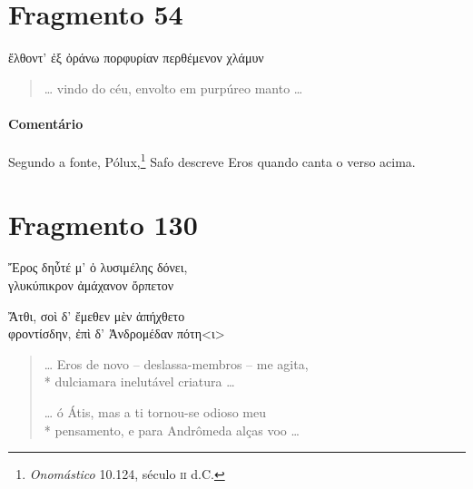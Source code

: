 \pagebreak
\section{Fragmento 54}

\begin{gkverse}
ἔλθοντ’ ἐξ ὀράνω πορφυρίαν περθέμενον χλάμυν
\end{gkverse}

\begin{verse}
\ldots{} vindo do céu, envolto em purpúreo manto \ldots{} 
\end{verse}

\medskip

{\paragraph{Comentário} Segundo a fonte, Pólux,\footnote{\textit{Onomástico} 10.124, século \textsc{ii} d.C.} Safo descreve Eros quando canta o verso acima.}

\section{Fragmento 130}

\begin{gkverse}
Ἔρος δηὖτέ μ’ ὀ λυσιμέλης δόνει,\\
			γλυκύπικρον ἀμάχανον ὄρπετον\\

\hspace*{22mm}

			Ἄτθι, σοὶ δ’ ἔμεθεν μὲν ἀπήχθετο\\
φροντίσδην, ἐπὶ δ’ Ἀνδρομέδαν πότη<ι>

\end{gkverse}

\begin{verse}
\ldots{} Eros de novo -- deslassa-membros -- me agita,\\*
dulciamara inelutável criatura \ldots{}

\hspace*{22mm}

\ldots{} ó Átis, mas a ti tornou-se odioso meu\\*
pensamento, e para Andrômeda alças voo \ldots{}
\end{verse}

